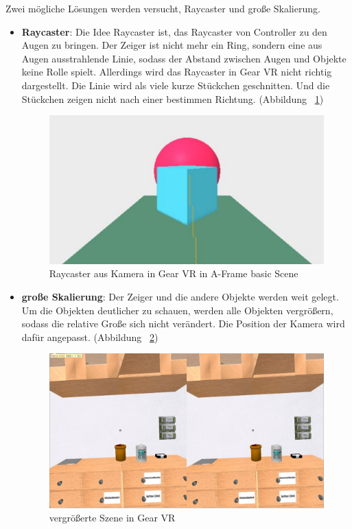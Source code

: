   Zwei mögliche Lösungen werden versucht, Raycaster und große Skalierung.
  \begin{itemize}
      \item \textbf{Raycaster}: Die Idee Raycaster ist, das Raycaster von Controller zu den Augen zu bringen. Der Zeiger ist nicht mehr ein Ring, sondern eine aus Augen ausstrahlende Linie, sodass der Abstand zwischen Augen und Objekte keine Rolle spielt. Allerdings wird das Raycaster in Gear VR nicht richtig dargestellt. Die Linie wird als viele kurze Stückchen geschnitten. Und die Stückchen zeigen nicht nach einer bestimmen Richtung. (Abbildung ~\ref{fig:GearVRRaycaster})
      
\begin{figure}[ht]
\vspace*{0.3cm}
\centering
\includegraphics[width=\textwidth]{images/gearVRRaycaster.png}
\caption[Raycaster in Gear VR]{Raycaster aus Kamera in Gear VR in A-Frame basic Scene}
\label{fig:GearVRRaycaster} 
\end{figure}
      
      \item \textbf{große Skalierung}: Der Zeiger und die andere Objekte werden weit gelegt. Um die Objekten deutlicher zu schauen, werden alle Objekten vergrößern, sodass die relative Große sich nicht verändert. Die Position der Kamera wird dafür angepasst.
      (Abbildung ~\ref{fig:GearVRCursor})
      
\begin{figure}[t]
\vspace*{0.3cm}
\centering
\includegraphics[width=\textwidth]{images/gearVRCursor.png}
\caption[vergrößerte Szene in Gear VR]{vergrößerte Szene in Gear VR}
\label{fig:GearVRCursor} 
\end{figure}
      
  \end{itemize}
  
